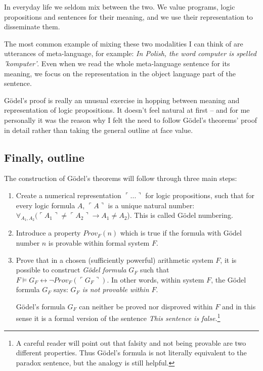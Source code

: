 \documentclass{article}
\begin{document}
In everyday life we seldom mix between the two. We value programs, logic propositions
and sentences for their meaning, and we use their representation to disseminate them.

The most common example of mixing these two modalities I can think of are utterances of
meta-language, for example: \textit{In Polish, the word computer is spelled 'komputer'}.
Even when we read the whole meta-language sentence for its meaning, we focus on the
representation in the object language part of the sentence.

Gödel's proof is really an unusual exercise in hopping between meaning and representation
of logic propositions. It doesn't feel natural at first -- and for me personally it was
the reason why I felt the need to follow Gödel's theorems' proof in detail rather than
taking the general outline at face value.

\subsection{Finally, outline}

The construction of Gödel's theorems will follow through three main steps:

\begin{enumerate}
    \item Create a numerical representation $\ulcorner ... \urcorner$ for logic propositions,
        such that for every logic formula $A$, $\ulcorner A \urcorner$ is a unique natural number:
        $\forall_{A_1, A_2} (\ulcorner A_1 \urcorner \neq \ulcorner A_2 \urcorner
        \rightarrow A_1 \neq A_2$). This is called Gödel numbering.
    \item Introduce a property $Prov_F(n)$ which is true if the formula with Gödel number $n$
        is provable within formal system $F$.
    \item Prove that in a chosen (sufficiently powerful) arithmetic system $F$,
        it is possible to construct \textit{Gödel formula} $G_F$ such that
        $F \models G_F \leftrightarrow \neg Prov_F(\ulcorner G_F \urcorner)$. In other words, within system
        $F$, the Gödel formula $G_F$ says: \textit{$G_F$ is not provable within $F$}.

        Gödel's formula $G_F$ can neither be proved nor disproved within $F$ and in this
        sense it is a formal version of the sentence \textit{This sentence is false.}\footnote{
            A careful reader will point out that falsity and not being provable are two different
            properties. Thus Gödel's formula is not literally equivalent to the
            paradox sentence, but the analogy is still helpful.
        }
\end{enumerate}
\end{document}
